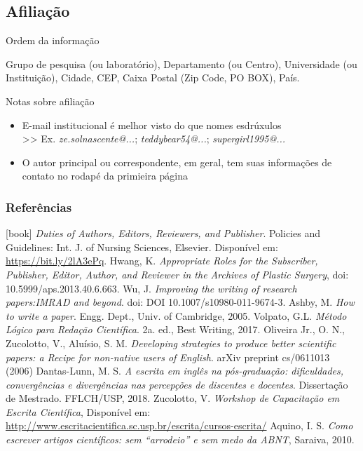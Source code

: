 \subsection{Afiliação}

\begin{frame}{Ordem da informação}
\begin{block}{}
Grupo de pesquisa (ou laboratório), Departamento (ou Centro), Universidade (ou Instituição), Cidade, CEP, Caixa Postal (Zip Code, PO BOX), País.
\end{block}
\end{frame}

\begin{frame}{Notas sobre afiliação}
\begin{itemize}
\item E-mail institucional é melhor visto do que nomes esdrúxulos \\ 
>> Ex. \textit{ze.solnascente@...}; \textit{teddybear54@...}; \textit{supergirl1995@...}
\item O autor principal ou correspondente, em geral, tem suas informações de contato no rodapé da primieira página
\end{itemize}

\end{frame}

\begin{frame}[allowframebreaks]
\frametitle{Referências}
\begin{thebibliography}{9}
[book]
%
\textit{Duties of Authors, Editors, Reviewers, and Publisher}. Policies and Guidelines: Int. J. of Nursing Sciences, Elsevier. Disponível em: \url{https://bit.ly/2lA3ePq}.
%
Hwang, K. \textit{Appropriate Roles for the Subscriber, Publisher, Editor, Author, and Reviewer in the Archives of Plastic Surgery}, doi: 10.5999/aps.2013.40.6.663.
%
Wu, J. \textit{Improving the writing of research papers:IMRAD and beyond}. doi: DOI 10.1007/s10980-011-9674-3.
%
Ashby, M. \textit{How to write a paper}. Engg. Dept., Univ. of Cambridge, 2005.
%
Volpato, G.L. \textit{Método Lógico para Redação Científica}. 2a. ed., Best Writing, 2017.
%
Oliveira Jr., O. N., Zucolotto, V., Aluísio, S. M. \textit{Developing strategies to produce better scientific papers: a Recipe for non-native users of English}. arXiv preprint cs/0611013 (2006)
%
Dantas-Lunn, M. S. \textit{A escrita em inglês na pós-graduação: dificuldades, convergências e divergências nas percepções de discentes e docentes}. Dissertação de Mestrado. FFLCH/USP, 2018.
%
Zucolotto, V. \textit{Workshop de Capacitação em Escrita Científica}, Disponível em: \url{http://www.escritacientifica.sc.usp.br/escrita/cursos-escrita/}
%
Aquino, I. S. \textit{Como escrever artigos científicos: sem ``arrodeio'' e sem medo da ABNT}, Saraiva, 2010.
\end{thebibliography}
\end{frame}